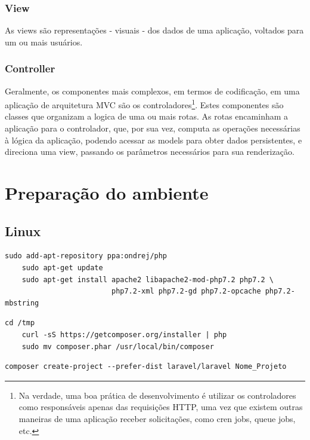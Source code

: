 \documentclass[
12pt,				%
openany,			%
twoside,			%
a4paper,			%
english,			%
french,				%
spanish,			%
brazil,				%
]{abntex2}
\begin{document}
\subsubsection{View}
As views são representações - visuais - dos dados de uma aplicação, voltados para um ou
mais usuários.
\subsubsection{Controller}
Geralmente, os componentes mais complexos, em termos de codificação, em uma aplicação
de arquitetura MVC são os controladores\footnote{ Na verdade, uma boa prática de desenvolvimento é utilizar os controladores como responsáveis
    apenas das requisições HTTP, uma vez que existem outras maneiras de uma aplicação receber
solicitações, como cren jobs, queue jobs, etc.}. Estes componentes são classes que organizam a
logica de uma ou mais rotas. As rotas encaminham a aplicação para o controlador, que, por
sua vez, computa as operações necessárias à lógica da aplicação, podendo acessar as models
para obter dados persistentes, e direciona uma view, passando os parâmetros necessários
para sua renderização.

\section{Preparação do ambiente}
\subsection{Linux}

\begin{lstlisting}[style=bash,caption={Instalando Apache e PHP 7.2}]
    sudo add-apt-repository ppa:ondrej/php
    sudo apt-get update
    sudo apt-get install apache2 libapache2-mod-php7.2 php7.2 \
                         php7.2-xml php7.2-gd php7.2-opcache php7.2-mbstring
\end{lstlisting}


\begin{lstlisting}[style=bash,caption={Instalando o Composer (gerenciador de pacotes PHP)}]
    cd /tmp
    curl -sS https://getcomposer.org/installer | php
    sudo mv composer.phar /usr/local/bin/composer
\end{lstlisting}

\begin{lstlisting}[style=bash,caption={Criando novo projeto Laravel}]
    composer create-project --prefer-dist laravel/laravel Nome_Projeto
\end{lstlisting}
\end{document}
